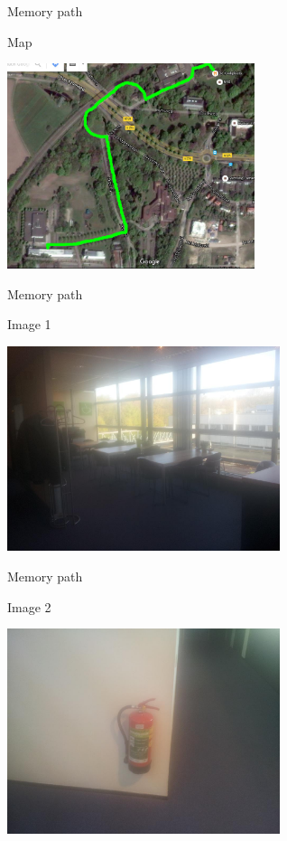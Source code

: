 \begin{frame}{Memory path}
  \begin{block}{Map}
    \begin{center}
      \includegraphics[height=6cm]{img/map.jpg}
    \end{center}
  \end{block}
\end{frame}

\begin{frame}{Memory path}
  \begin{block}{Image 1}
    \begin{center}
      \includegraphics[height=6cm]{img/loci/01.jpg}
    \end{center}
  \end{block}
\end{frame}

\begin{frame}{Memory path}
  \begin{block}{Image 2}
    \begin{center}
      \includegraphics[height=6cm]{img/loci/02.jpg}
    \end{center}
  \end{block}
\end{frame}

